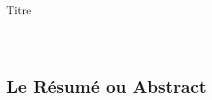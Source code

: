 \begin{frame}[fragile]{Titre}
\begin{columns}
\begin{column}{0.5\textwidth}
\begin{lstlisting}[style=nonumbers,mathescape]
      \end{lstlisting}
    \end{column}
    \begin{column}{0.5\textwidth}
  \centering
    \end{column}
  \end{columns}
\end{frame}

\subsection{Le Résumé ou Abstract}

